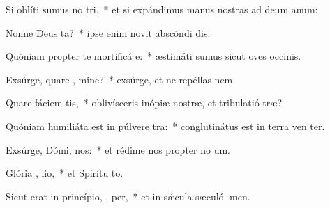 \item Si oblíti sumus no  tri,~* et si expándimus manus nostras ad deum anum:
\item Nonne Deus  ta?~* ipse enim novit abscóndi dis.
\item Quóniam propter te mortificá  e:~* æstimáti sumus sicut oves occinis.
\item Exsúrge, quare , mine?~* exsúrge, et ne repéllas  nem.
\item Quare fáciem  tis,~* oblivísceris inópiæ nostræ, et tribulatió træ?
\item Quóniam humiliáta est in púlvere  tra:~* conglutinátus est in terra ven ter.
\item Exsúrge, Dómi,  nos:~* et rédime nos propter no um.
\item Glória ,  lio,~* et Spirítu to.
\item Sicut erat in princípio,  ,  per,~* et in sǽcula sæculó. men.
